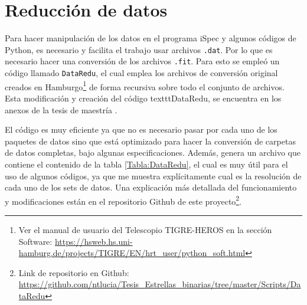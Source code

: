 \documentclass[12pt,oneside,openany,letter]{book}
\begin{document}
\section{Reducción de datos}

Para hacer manipulación de los datos en el programa iSpec y algunos códigos de Python, es necesario y facilita el trabajo usar archivos \texttt{.dat}. Por lo que es necesario hacer una conversión de los archivos \texttt{.fit}. Para esto se empleó un código llamado \texttt{DataRedu}, el cual emplea los archivos de conversión original creados en Hamburgo\footnote{Ver el manual de usuario del Telescopio TIGRE-HEROS en la sección Software: \url{https://hsweb.hs.uni-hamburg.de/projects/TIGRE/EN/hrt_user/python_soft.html}} de forma recursiva sobre todo el conjunto de archivos. Esta modificación y creación del código texttt{DataRedu}, se encuentra en los anexos de la tesis de maestría \citep{Faiber2019master}.


\noindent El código es muy eficiente ya que no es necesario pasar por cada uno de los paquetes de datos sino que está optimizado para hacer la conversión de carpetas de datos completas, bajo algunas especificaciones. Además, genera un archivo que contiene el contenido de la tabla \ref{Tabla:DataRedu}, el cual es muy útil para el uso de algunos códigos, ya que me muestra explícitamente cual es la resolución de cada uno de los sets de datos. Una explicación más detallada del funcionamiento y modificaciones están en el repositorio Github de este proyecto\footnote{ Link de repositorio en Github: \url{https://github.com/ntlucia/Tesis_Estrellas_binarias/tree/master/Scripts/DataRedu}}.
\end{document}
